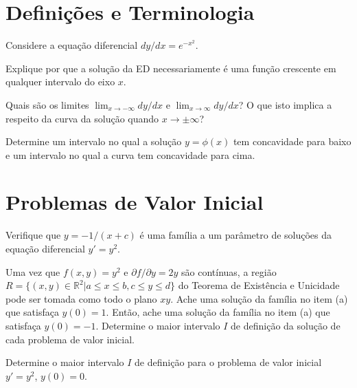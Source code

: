 \documentclass[oneside,12pt,a4paper]{report}
\begin{document}
%


\section{Definições e Terminologia}

 Considere a equação diferencial $dy/dx=e^{-x^2}$.
\begin{itensquestao}
    \item Explique por que a solução da ED necessariamente é uma função crescente em qualquer intervalo do eixo $x$.
    \item Quais são os limites $\displaystyle\lim_{x\to-\infty}dy/dx$ e $\displaystyle\lim_{x\to\infty}dy/dx$? O que isto implica a respeito da curva da solução quando $x\to\pm\infty$?
    \item Determine um intervalo no qual a solução $y=\phi(x)$ tem concavidade para baixo e um intervalo no qual a curva tem concavidade para cima.
\end{itensquestao}

\section{Problemas de Valor Inicial}

\begin{itensquestao}
    \item Verifique que $y=-1/(x+c)$ é uma família a um parâmetro de soluções da equação diferencial $y'=y^2$.
    \item Uma vez que $f(x,y)=y^2$ e $\partial f/\partial y=2y$ são contínuas, a região $R=\{(x,y)\in\mathbb{R}^2|a\leq x\leq b, c\leq y \leq d\}$ do Teorema de Existência e Unicidade pode ser tomada como todo o plano $xy$. Ache uma solução da família no item (a) que satisfaça $y(0)=1$. Então, ache uma solução da família no item (a) que satisfaça $y(0)=-1$. Determine o maior intervalo $I$ de definição da solução de cada problema de valor inicial.
    \item Determine o maior intervalo $I$ de definição para o problema de valor inicial $y'=y^2$, $y(0)=0$.
\end{itensquestao}
\end{document}
